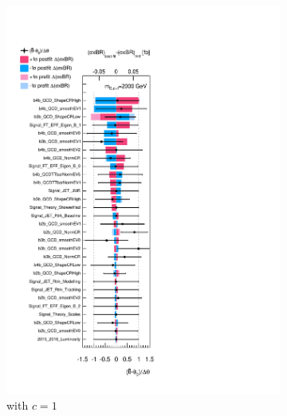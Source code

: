 \begin{figure}[htb!]
\begin{subfigure}[b]{0.31\textwidth}
        \includegraphics[width=\textwidth]{figures/boosted/results/ranking_okt18_g10_2000.pdf}
        \caption{\Grav with $c=1$}
        \label{fig:ranking2000-g1}
    \end{subfigure}
    \quad
    \begin{subfigure}[b]{0.31\textwidth}

\end{subfigure}
\end{figure}
